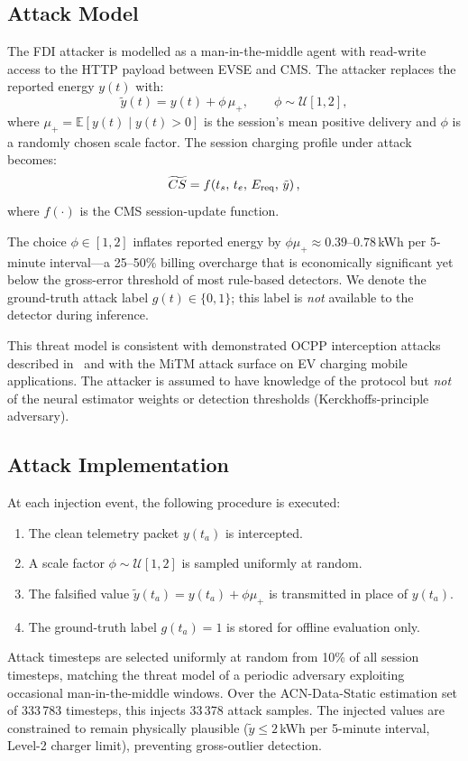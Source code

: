 \documentclass[journal]{IEEEtran}
\begin{document}
\subsection{Attack Model}

The FDI attacker is modelled as a man-in-the-middle agent with
read-write access to the HTTP payload between EVSE and CMS.
The attacker replaces the reported energy $y(t)$ with:
\begin{equation}
  \tilde{y}(t) = y(t) + \phi\,\mu_+,
  \qquad \phi \sim \mathcal{U}[1,2],
  \label{eq:attack}
\end{equation}
where $\mu_+ = \mathbb{E}[y(t)\mid y(t)>0]$ is the session's mean
positive delivery and $\phi$ is a randomly chosen scale factor.
The session charging profile under attack becomes:
\begin{equation}
  \widetilde{CS} = f\!\left(t_s,\,t_e,\,E_{\rm req},\,
  \tilde{y}\right),
  \label{eq:session}
\end{equation}
where $f(\cdot)$ is the CMS session-update function.

The choice $\phi\in[1,2]$ inflates reported energy by
$\phi\mu_+ \approx 0.39$--$0.78$\,kWh per 5-minute interval---a
25--50\% billing overcharge that is economically significant yet
below the gross-error threshold of most rule-based detectors.
We denote the ground-truth attack label $g(t)\in\{0,1\}$; this
label is \emph{not} available to the detector during inference.

This threat model is consistent with demonstrated OCPP
interception attacks described in~\cite{sarieddine2023} and with
the MiTM attack surface on EV charging mobile applications.
The attacker is assumed to have knowledge of the protocol but
\emph{not} of the neural estimator weights or detection thresholds
(Kerckhoffs-principle adversary).

\subsection{Attack Implementation}

At each injection event, the following procedure is executed:
\begin{enumerate}
  \item The clean telemetry packet $y(t_a)$ is intercepted.
  \item A scale factor $\phi\sim\mathcal{U}[1,2]$ is sampled
        uniformly at random.
  \item The falsified value $\tilde{y}(t_a)=y(t_a)+\phi\mu_+$
        is transmitted in place of $y(t_a)$.
  \item The ground-truth label $g(t_a)=1$ is stored for offline
        evaluation only.
\end{enumerate}
Attack timesteps are selected uniformly at random from 10\% of
all session timesteps, matching the threat model of a periodic
adversary exploiting occasional man-in-the-middle windows.
Over the ACN-Data-Static estimation set of 333\,783 timesteps,
this injects 33\,378 attack samples.
The injected values are constrained to remain physically plausible
($\tilde{y}\leq2$\,kWh per 5-minute interval, Level-2 charger
limit), preventing gross-outlier detection.
\end{document}
